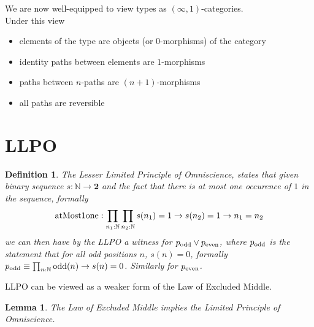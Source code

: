 \documentclass[12pt]{article}
\newtheorem{defn}[thm]{Definition}
\newtheorem{lem}[thm]{Lemma}
\begin{document}
We are now well-equipped to view types as $(\infty, 1)$-categories.\\
Under this view 
\begin{itemize}
	\item elements of the type are objects (or $0$-morphisms) of the category
	\item identity paths between elements are $1$-morphisms
	\item paths between $n$-paths are $(n+1)$-morphisms
	\item all paths are reversible
\end{itemize}

\section{LLPO}
\begin{defn} 
The Lesser Limited Principle of Omniscience, states that given binary sequence $s : \mathbb{N} \rightarrow \mathbf{2}$ and the fact that there is at most one occurence of $1$ in the sequence, formally 
$$\textnormal{atMost1one} :\prod_{n_1 : \mathbb{N}} \prod_{n_2 : \mathbb{N}} s(n_1) = 1 \rightarrow s(n_2)= 1 \rightarrow n_1 = n_2$$
we can then have by the LLPO a witness for $p_\textnormal{odd} \vee p_\textnormal{even}$, where $p_\textnormal{odd}$ is the statement that for all odd positions $n$, $s(n) = 0$, formally $p_\textnormal{odd} \equiv \prod_{n : \mathbb{N}} \textnormal{odd}(n) \rightarrow s(n) = 0$. 
Similarly for $p_\textnormal{even}$. 
\end{defn}
LLPO can be viewed as a weaker form of the Law of Excluded Middle. 

\begin{lem} 
The Law of Excluded Middle implies the Limited Principle of Omniscience.
\end{lem}
\end{document}
